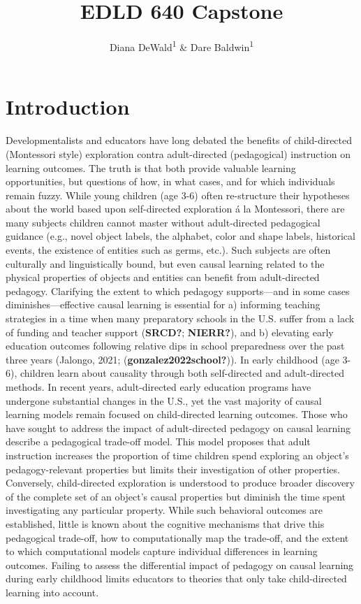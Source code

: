 \documentclass[
  english,
  man]{apa6}
\title{EDLD 640 Capstone}
\author{Diana DeWald\textsuperscript{1} \& Dare Baldwin\textsuperscript{1}}
\date{}
\affiliation{\vspace{0.5cm}\textsuperscript{1} University of Oregon}
\begin{document}
\maketitle

\hypertarget{introduction}{%
\section{Introduction}\label{introduction}}

Developmentalists and educators have long debated the benefits of child-directed (Montessori style) exploration contra adult-directed (pedagogical) instruction on learning outcomes. The truth is that both provide valuable learning opportunities, but questions of how, in what cases, and for which individuals remain fuzzy. While young children (age 3-6) often re-structure their hypotheses about the world based upon self-directed exploration á la Montessori, there are many subjects children cannot master without adult-directed pedagogical guidance (e.g., novel object labels, the alphabet, color and shape labels, historical events, the existence of entities such as germs, etc.). Such subjects are often culturally and linguistically bound, but even causal learning related to the physical properties of objects and entities can benefit from adult-directed pedagogy. Clarifying the extent to which pedagogy supports---and in some cases diminishes---effective causal learning is essential for a) informing teaching strategies in a time when many preparatory schools in the U.S. suffer from a lack of funding and teacher support (\textbf{SRCD?}; \textbf{NIERR?}), and b) elevating early education outcomes following relative dips in school preparedness over the past three years (Jalongo, 2021; (\textbf{gonzalez2022school?})).
In early childhood (age 3-6), children learn about causality through both self-directed and adult-directed methods. In recent years, adult-directed early education programs have undergone substantial changes in the U.S., yet the vast majority of causal learning models remain focused on child-directed learning outcomes. Those who have sought to address the impact of adult-directed pedagogy on causal learning describe a pedagogical trade-off model. This model proposes that adult instruction increases the proportion of time children spend exploring an object's pedagogy-relevant properties but limits their investigation of other properties. Conversely, child-directed exploration is understood to produce broader discovery of the complete set of an object's causal properties but diminish the time spent investigating any particular property. While such behavioral outcomes are established, little is known about the cognitive mechanisms that drive this pedagogical trade-off, how to computationally map the trade-off, and the extent to which computational models capture individual differences in learning outcomes. Failing to assess the differential impact of pedagogy on causal learning during early childhood limits educators to theories that only take child-directed learning into account.
\end{document}
